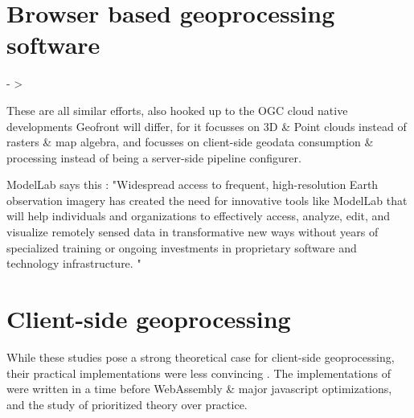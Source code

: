 




\section*{Browser based geoprocessing software}

- >

These are all similar efforts, also hooked up to the OGC cloud native developments
Geofront will differ, for it focusses on 3D \& Point clouds instead of rasters \& map algebra, and focusses on client-side geodata consumption \& processing instead of being a server-side pipeline configurer.

ModelLab says this : "Widespread access to frequent, high-resolution Earth observation imagery has created the need for innovative tools like ModelLab that will help individuals and organizations to effectively access, analyze, edit, and visualize remotely sensed data in transformative new ways without years of specialized training or ongoing investments in proprietary software and technology infrastructure. "



\section{Client-side geoprocessing}


While these studies pose a strong theoretical case for client-side geoprocessing, their practical implementations were less convincing . 
The implementations of \cite{panidi_hybrid_2015, hamilton_client-side_2014} were written in a time before WebAssembly \& major javascript optimizations, and the study of \cite{kulawiak_analysis_2019} prioritized theory over practice. 


